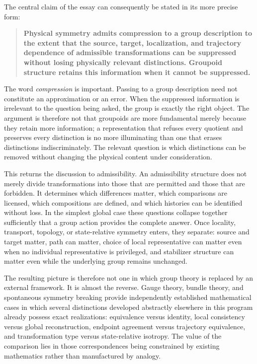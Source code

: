\documentclass[11pt]{article}
\begin{document}
The central claim of the essay can consequently be stated in its more precise form:
\begin{quote}
\textbf{Physical symmetry admits compression to a group description to the extent that the source, target, localization, and trajectory dependence of admissible transformations can be suppressed without losing physically relevant distinctions. Groupoid structure retains this information when it cannot be suppressed.}
\end{quote}
The word \emph{compression} is important. Passing to a group description need not constitute an approximation or an error. When the suppressed information is irrelevant to the question being asked, the group is exactly the right object. The argument is therefore not that groupoids are more fundamental merely because they retain more information; a representation that refuses every quotient and preserves every distinction is no more illuminating than one that erases distinctions indiscriminately. The relevant question is which distinctions can be removed without changing the physical content under consideration.

This returns the discussion to admissibility. An admissibility structure does not merely divide transformations into those that are permitted and those that are forbidden. It determines which differences matter, which comparisons are licensed, which compositions are defined, and which histories can be identified without loss. In the simplest global case these questions collapse together sufficiently that a group action provides the complete answer. Once locality, transport, topology, or state-relative symmetry enters, they separate: source and target matter, path can matter, choice of local representative can matter even when no individual representative is privileged, and stabilizer structure can matter even while the underlying group remains unchanged.

The resulting picture is therefore not one in which group theory is replaced by an external framework. It is almost the reverse. Gauge theory, bundle theory, and spontaneous symmetry breaking provide independently established mathematical cases in which several distinctions developed abstractly elsewhere in this program already possess exact realizations: equivalence versus identity, local consistency versus global reconstruction, endpoint agreement versus trajectory equivalence, and transformation type versus state-relative isotropy. The value of the comparison lies in those correspondences being constrained by existing mathematics rather than manufactured by analogy.
\end{document}
